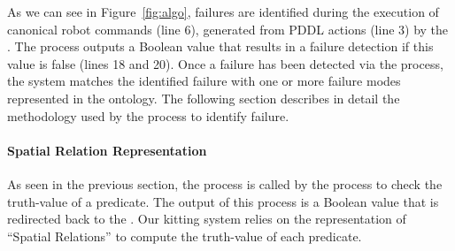 As we can see in Figure~\ref{fig:algo}, failures are identified during the execution of canonical robot commands (line 6), generated from PDDL actions (line 3) by the . The  process outputs a Boolean value that results in a failure detection if this value is false (lines 18 and 20). Once a failure has been detected via the  process, the system matches the identified failure with one or more failure modes represented in the ontology. The following section describes in detail the methodology used by the  process to identify failure.


\paragraph{Spatial Relation Representation}
As seen in the previous section, the  process is called by the  process to check the truth-value of a predicate. The output of this process is a Boolean value that is redirected back to the . Our kitting system relies on the representation of ``Spatial Relations'' to compute the truth-value of each predicate.

